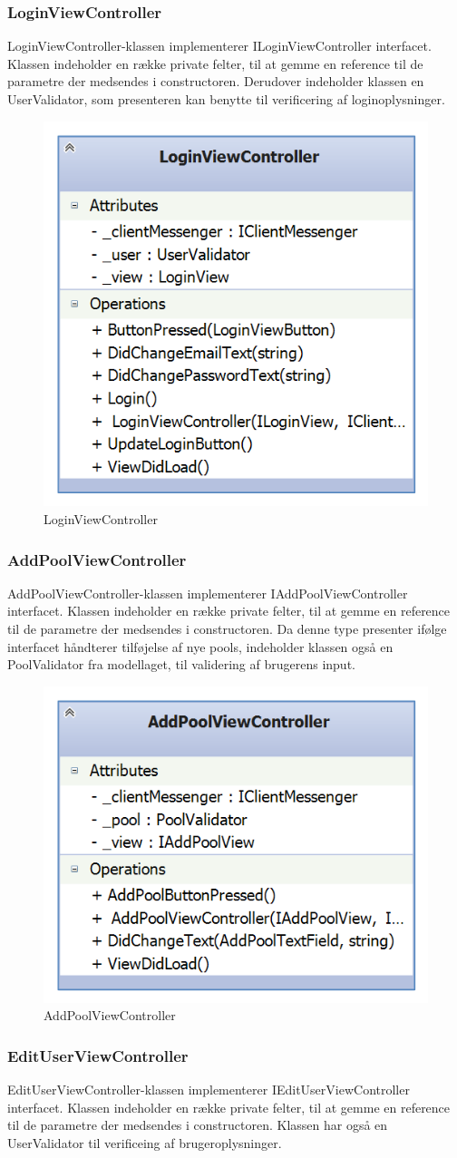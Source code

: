 \subsubsection{LoginViewController}
LoginViewController-klassen implementerer ILoginViewController interfacet. Klassen indeholder en række private felter, til at gemme en reference til de parametre der medsendes i constructoren. Derudover indeholder klassen en UserValidator, som presenteren kan benytte til verificering af loginoplysninger.

\begin{figure}
	\centering
	\includegraphics[width=0.3\linewidth]{figs/design/application_loginviewcontroller}
	\caption{LoginViewController}
	\label{fig:application_loginviewcontroller}
\end{figure}

\subsubsection{AddPoolViewController}
AddPoolViewController-klassen implementerer IAddPoolViewController interfacet. Klassen indeholder en række private felter, til at gemme en reference til de parametre der medsendes i constructoren. Da denne type presenter ifølge interfacet håndterer tilføjelse af nye pools, indeholder klassen også en PoolValidator fra modellaget, til validering af brugerens input.

\begin{figure}
	\centering
	\includegraphics[width=0.3\linewidth]{figs/design/application_addpoolviewcontroller}
	\caption{AddPoolViewController}
	\label{fig:application_addpoolviewcontroller}
\end{figure}

\subsubsection{EditUserViewController}
EditUserViewController-klassen implementerer IEditUserViewController interfacet. Klassen indeholder en række private felter, til at gemme en reference til de parametre der medsendes i constructoren. Klassen har også en UserValidator til verificeing af brugeroplysninger.

